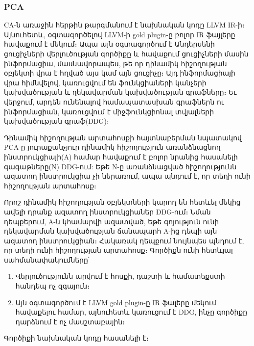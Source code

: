 \subsubsection{PCA}
CA\cite{Li2020}-ն առաջին հերթին թարգմանում է նախնական կոդը LLVM IR-ի։ Այնուհետև, օգտագործելով LLVM-ի gold plugin-ը
բոլոր IR ֆայլերը հավաքում է մեկում։ Ապա այն օգտագործում է Անդերսենի ցուցիչների վերլուծության գործիքը\cite{Andersen}
և հավաքում ցուցիչների մասին ինֆորմացիա, մասնավորապես, թե որ դինամիկ հիշողության օբյեկտի վրա է հղված այս կամ այն ցուցիչը։
Այդ ինֆորմացիայի վրա հիմնվելով, կառուցվում են ֆունկցիաների կանչերի կախվածության և ղեկավարման կախվածության գրաֆները։
Եւ վերջում, արդեն ունենալով համապատասխան գրաֆներն ու ինֆորմացիան, կառուցվում է միջֆունկցիոնալ տվյալների կախվածության գրաֆ(DDG)։

Դինամիկ հիշողության արտահոսքի հայտնաբերման նպատակով PCA-ը յուրաքանչյուր դինամիկ հիշողություն առանձնացնող ինստրուկցիայի(A)
համար հավաքում է բոլոր նրանից հասանելի գագաթները(N) DDG-ում: Եթե N-ը առանձնացված հիշողությունն ազատող ինստրուկցիա
չի ներառում, ապա պնդում է, որ տեղի ունի հիշողության արտահոսք։

Որոշ դինամիկ հիշողության օբյեկտների կարող են հետևել մեկից ավելի դրանք ազատող ինստրուկցիաներ DDG-ում։
Նման դեպքերում, A-ն կհամարվի ազատված, եթե գոյություն ունի ղեկավարման կախվածության ճանապարհ A-ից դեպի այն ազատող
ինստրուկցիան։ Հակառակ դեպքում նույնպես պնդում է, որ տեղի ունի հիշողության արտահոսք։ Գործիքն ունի հետևյալ սահմանափակումները՝
\begin{enumerate}
    \item Վերլուծությունն արվում է հոսքի, դաշտի և համատեքստի հանդեպ ոչ զգայուն։
    \item Այն օգտագործում է LLVM gold plugin-ը IR ֆալերը մեկում հավաքելու համար, այնուհետև կառուցում է DDG, ինչը գործիքը
    դարձնում է ոչ մասշտաբային։
\end{enumerate}

Գործիքի նախնական կոդը հասանելի է\cite{PCA}։
